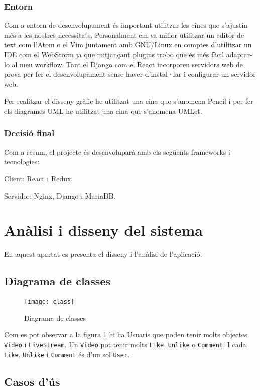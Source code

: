 \documentclass[12pt, titlepage]{article}
\begin{document}
\subsubsection{Entorn}
Com a entorn de desenvolupament és important utilitzar les eines que s’ajustin
més a les nostres necessitats. Personalment em va millor utilitzar un editor de text
com l’Atom o el Vim juntament amb GNU/Linux en comptes d'utilitzar un IDE com
el WebStorm ja que mitjançant plugins trobo que és més fàcil adaptar-lo al meu
workflow. Tant el Django com el React incorporen servidors web de prova per fer
el desenvolupament sense haver d’instal·lar i configurar un servidor web.

Per realitzar el disseny gràfic he utilitzat una eina que s'anomena Pencil i per
fer els diagrames UML he utilitzat una eina que s'anomena UMLet.

\subsubsection{Decisió final}
Com a resum, el projecte és desenvoluparà amb els següents
frameworks i tecnologies:

Client: React i Redux.

Servidor: Nginx, Django i MariaDB.


\section{Anàlisi i disseny del sistema}

En aquest apartat es presenta el disseny i l'anàlisi de l'aplicació.

\subsection{Diagrama de classes}

\begin{figure}[H]
\centering
\texttt{[image: class]}
\caption{Diagrama de classes}
\label{class}
\end{figure}

Com es pot observar a la figura \ref{class} hi ha Usuaris que poden tenir molts objectes
 \verb|Video| i \verb|LiveStream|. Un \verb|Video| pot tenir molts \verb|Like|, \verb|Unlike| o
\verb|Comment|. I cada \verb|Like|, \verb|Unlike| i \verb|Comment| és d'un sol \verb|User|.


\subsection{Casos d'ús}
\end{document}
